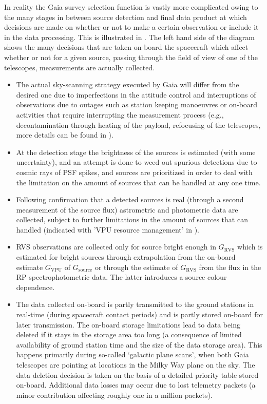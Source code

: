 In reality the Gaia survey selection function is vastly more complicated owing to the many stages in between source detection and final data product at which decisions are made on whether or not to make a certain observation or include it in the data processing. This is illustrated in . The left hand side of the diagram shows the many decisions that are taken on-board the spacecraft which affect whether or not for a given source, passing through the field of view of one of the telescopes, measurements are actually collected.
\begin{itemize}
    \item The actual sky-scanning strategy executed by Gaia will differ from the desired one due to imperfections in the attitude control and interruptions of observations due to outages such as station keeping manoeuvres or on-board activities that require interrupting the measurement process (e.g., decontamination through heating of the payload, refocusing of the telescopes, more details can be found in \cite{2016A&A...595A...1G}).
    \item At the detection stage the brightness of the sources is estimated (with some uncertainty), and an attempt is done to weed out spurious detections due to cosmic rays of PSF spikes, and sources are prioritized in order to deal with the limitation on the amount of sources that can be handled at any one time.
    \item Following confirmation that a detected sources is real (through a second measurement of the source flux) astrometric and photometric data are collected, subject to further limitations in the amount of sources that can handled (indicated with 'VPU resource management' in ).
    \item RVS observations are collected only for source bright enough in $G_\mathrm{RVS}$ which is estimated for bright sources through extrapolation from the on-board estimate $G_\mathrm{VPU}$ of $G_\mathrm{source}$ or through the estimate of $G_\mathrm{RVS}$ from the flux in the RP spectrophotometric data. The latter introduces a source colour dependence.
    \item The data collected on-board is partly transmitted to the ground stations in real-time (during spacecraft contact periods) and is partly stored on-board for later transmission. The on-board storage limitations lead to data being deleted if it stays in the storage area too long (a consequence of limited availability of ground station time and the size of the data storage area). This happens primarily during so-called `galactic plane scans', when both Gaia telescopes are pointing at locations in the Milky Way plane on the sky. The data deletion decision is taken on the basis of a detailed priority table stored on-board. Additional data losses may occur due to lost telemetry packets (a minor contribution affecting roughly one in a million packets).
\end{itemize}

